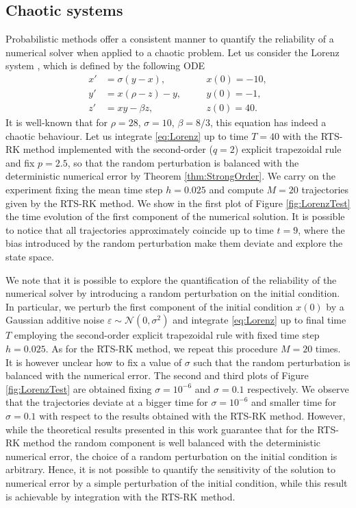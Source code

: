 \documentclass{siamart1116}
\numberwithin{theorem}{section}
\newcommand{\epl}{\varepsilon}
\begin{document}
\subsection{Chaotic systems}
Probabilistic methods offer a consistent manner to quantify the reliability of a numerical solver when applied to a chaotic problem. Let us consider the Lorenz system \cite{Lor63}, which is defined by the following ODE
\begin{equation}\label{eq:Lorenz}
	\begin{aligned}
		x' &= \sigma(y - x), \quad &&x(0) = -10,\\
		y' &= x(\rho - z) - y, \quad &&y(0) = -1,\\
		z' &= xy - \beta z, \quad &&z(0) = 40.
	\end{aligned}
\end{equation}
It is well-known that for $\rho=28$, $\sigma=10$, $\beta=8/3$, this equation has indeed a chaotic behaviour. Let us integrate \eqref{eq:Lorenz} up to time $T = 40$ with the RTS-RK method implemented with the second-order ($q = 2$) explicit trapezoidal rule and fix $p = 2.5$, so that the random perturbation is balanced with the deterministic numerical error by Theorem \ref{thm:StrongOrder}.  We carry on the experiment fixing the mean time step $h = 0.025$ and compute $M = 20$ trajectories given by the RTS-RK method. We show in the first plot of Figure \ref{fig:LorenzTest} the time evolution of the first component of the numerical solution. It is possible to notice that all trajectories approximately coincide up to time $t = 9$, where the bias introduced by the random perturbation make them deviate and explore the state space.

We note that it is possible to explore the quantification of the reliability of the numerical solver by introducing a random perturbation on the initial condition. In particular, we perturb the first component of the initial condition $x(0)$ by a Gaussian additive noise $\epl \sim \mathcal{N}(0, \sigma^2)$ and integrate \eqref{eq:Lorenz} up to final time $T$ employing the second-order explicit trapezoidal rule with fixed time step $h = 0.025$. As for the RTS-RK method, we repeat this procedure $M = 20$ times. It is however unclear how to fix a value of $\sigma$ such that the random perturbation is balanced with the numerical error. The second and third plots of Figure \ref{fig:LorenzTest} are obtained fixing $\sigma = 10^{-6}$ and $\sigma = 0.1$ respectively. We observe that the trajectories deviate at a bigger time for $\sigma = 10^{-6}$ and smaller time for $\sigma = 0.1$ with respect to the results obtained with the RTS-RK method. However, while the theoretical results presented in this work guarantee that for the RTS-RK method the random component is well balanced with the deterministic numerical error, the choice of a random perturbation on the initial condition is arbitrary. Hence, it is not possible to quantify the sensitivity of the solution to numerical error by a simple perturbation of the initial condition, while this result is achievable by integration with the RTS-RK method.
\end{document}
